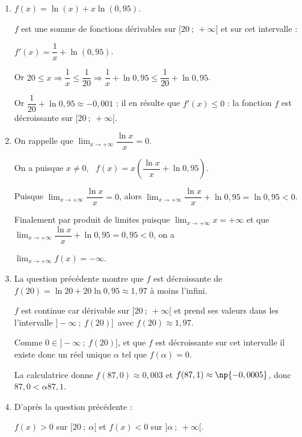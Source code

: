 \begin{enumerate}
\item 

$f(x) = \ln (x) + x \ln (0,95)$.

$f$ est une somme de fonctions dérivables sur $[20~;~ +\infty[$ et sur cet intervalle :

$f'(x) = \dfrac{1}{x} + \ln (0,95)$.



Or $20 \leqslant x \Rightarrow \dfrac{1}{x} \leqslant \dfrac{1}{20} \Rightarrow \dfrac{1}{x} + \ln 0,95\leqslant \dfrac{1}{20} + \ln 0,95$.

Or $\dfrac{1}{20} + \ln 0,95 \approx - 0,001$ ; il en résulte que $f'(x) \leqslant 0$ : la fonction $f$ est décroissante sur $[20~;~ +\infty[$.
\item On rappelle que $\displaystyle\lim_{x \to + \infty} \dfrac{\ln x}{x} = 0$. 


On a puisque $x \ne 0$, \, $f(x) = x\left(\dfrac{\ln x}{x} + \ln 0,95 \right)$.

Puisque  $\displaystyle\lim_{x \to + \infty} \dfrac{\ln x}{x} = 0$, alors  $\displaystyle\lim_{x \to + \infty} \dfrac{\ln x}{x} + \ln 0,95 = \ln 0,95 < 0$.

Finalement par produit de limites puisque $\displaystyle\lim_{x \to + \infty} x = + \infty$ et que $\displaystyle\lim_{x \to + \infty} \dfrac{\ln x}{x} + \ln 0,95 = 0,95 < 0$, on a 

$\displaystyle\lim_{x \to + \infty}f(x) = - \infty$.
\item 
La question précédente montre que $f$ est décroissante de $f(20) = \ln 20 + 20\ln 0,95 \approx 1,97$ à moins l'infini.

$f$ est continue car dérivable sur $[20~;~ +\infty[$ et prend ses valeurs dans les l'intervalle 
$]- \infty~;~f(20)]$\, avec $f(20) \approx 1,97$.

Comme $0 \in ]- \infty~;~f(20)]$, et que $f$ est décroissante sur cet intervalle  il existe donc un réel unique $\alpha$ tel que $f(\alpha) = 0$.

La calculatrice donne $f(87,0) \approx 0,003$ et $f(87,1) \approx \np{- 0,0005}$, donc 
$87,0 < \alpha 87,1$.

\item 
D'après la question précédente :

$f(x) > 0$ sur $[20~;~\alpha[$ et $f(x) < 0$ sur $]\alpha~;~+ \infty[$. 
\end{enumerate}

\bigskip

